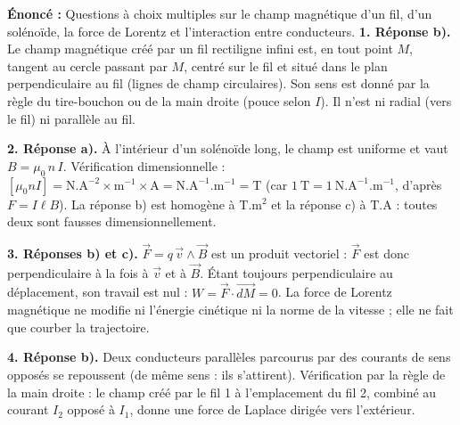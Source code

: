 \documentclass[11pt]{article}
\newcommand{\cle}[1]{{\popxbold\color{popdark}#1}}
\begin{document}
\begin{corrige}
\textbf{Énoncé :} Questions à choix multiples sur le champ magnétique d'un fil, d'un solénoïde, la force de Lorentz et l'interaction entre conducteurs.
\tcblower
\textbf{1. Réponse b).} Le champ magnétique créé par un fil rectiligne infini est, en tout point $M$, \cle{tangent au cercle} passant par $M$, centré sur le fil et situé dans le plan perpendiculaire au fil (lignes de champ circulaires). Son sens est donné par la règle du tire-bouchon ou de la main droite (pouce selon $I$). Il n'est ni radial (vers le fil) ni parallèle au fil.

\textbf{2. Réponse a).} À l'intérieur d'un solénoïde long, le champ est uniforme et vaut $\boxed{B = \mu_0\, n\, I}$. Vérification dimensionnelle : $[\mu_0 n I] = \mathrm{N.A^{-2} \times m^{-1} \times A} = \mathrm{N.A^{-1}.m^{-1}} = \mathrm{T}$ (car $1\ \mathrm{T} = 1\ \mathrm{N.A^{-1}.m^{-1}}$, d'après $F = I\ell B$). La réponse b) est homogène à $\mathrm{T.m^2}$ et la réponse c) à $\mathrm{T.A}$ : toutes deux sont fausses dimensionnellement.

\textbf{3. Réponses b) et c).} $\vec{F} = q\,\vec{v} \wedge \vec{B}$ est un produit vectoriel : $\vec{F}$ est donc \cle{perpendiculaire} à la fois à $\vec{v}$ et à $\vec{B}$. Étant toujours perpendiculaire au déplacement, son travail est nul : $W = \vec{F}\cdot\overrightarrow{dM} = 0$. La force de Lorentz magnétique ne modifie ni l'énergie cinétique ni la norme de la vitesse ; elle ne fait que courber la trajectoire.

\textbf{4. Réponse b).} Deux conducteurs parallèles parcourus par des courants de \cle{sens opposés se repoussent} (de même sens : ils s'attirent). Vérification par la règle de la main droite : le champ créé par le fil 1 à l'emplacement du fil 2, combiné au courant $I_2$ opposé à $I_1$, donne une force de Laplace dirigée vers l'extérieur.
\end{corrige}
\end{document}
